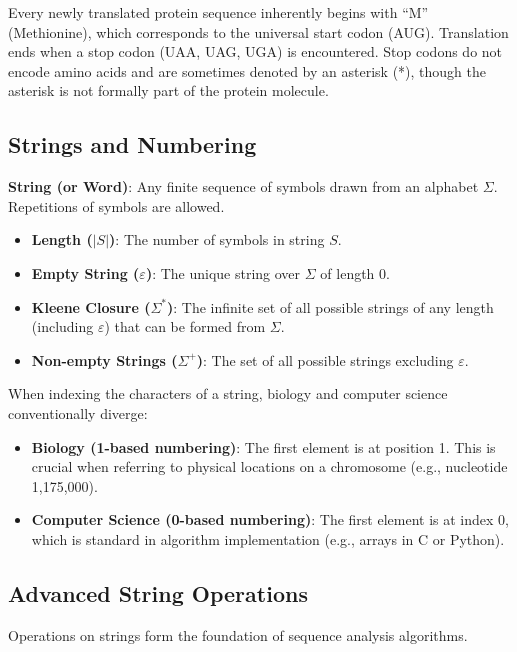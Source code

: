 \sta Every newly translated protein sequence inherently begins with ``M'' (Methionine), which corresponds to the universal start codon (AUG). Translation ends when a stop codon (UAA, UAG, UGA) is encountered. Stop codons do not encode amino acids and are sometimes denoted by an asterisk (*), though the asterisk is not formally part of the protein molecule.

\subsection{Strings and Numbering}

\begin{important}
    \textbf{String (or Word)}: Any finite sequence of symbols drawn from an alphabet \(\Sigma\). Repetitions of symbols are allowed.
    \begin{itemize}
        \item \textbf{Length (\(|S|\))}: The number of symbols in string \(S\).
        \item \textbf{Empty String (\(\varepsilon\))}: The unique string over \(\Sigma\) of length 0.
        \item \textbf{Kleene Closure (\(\Sigma^*\))}: The infinite set of all possible strings of any length (including \(\varepsilon\)) that can be formed from \(\Sigma\).
        \item \textbf{Non-empty Strings (\(\Sigma^+\))}: The set of all possible strings excluding \(\varepsilon\).
    \end{itemize}
\end{important}

When indexing the characters of a string, biology and computer science conventionally diverge:
\begin{itemize}
    \item \textbf{Biology (1-based numbering)}: The first element is at position 1. This is crucial when referring to physical locations on a chromosome (e.g., nucleotide 1,175,000).
    \item \textbf{Computer Science (0-based numbering)}: The first element is at index 0, which is standard in algorithm implementation (e.g., arrays in C or Python).
\end{itemize}

\subsection{Advanced String Operations}

Operations on strings form the foundation of sequence analysis algorithms. 

